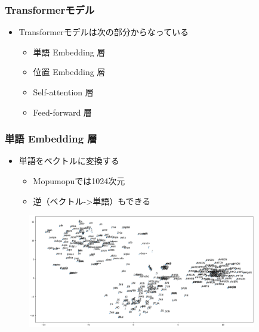 \documentclass[14pt]{beamer}
\begin{document}
\begin{frame}
	\frametitle{Transformerモデル}

	\begin{itemize}
		\item Transformerモデルは次の部分からなっている
			\begin{itemize}
				\item 単語 Embedding 層
				\item 位置 Embedding 層
				\item Self-attention 層
				\item Feed-forward 層
			\end{itemize}
	\end{itemize}

\end{frame}

\begin{frame}
	\frametitle{単語 Embedding 層}

	\begin{itemize}
		\item 単語をベクトルに変換する
			\begin{itemize}
				\item Mopumopuでは1024次元
				\item 逆（ベクトル->単語）もできる
			\end{itemize}
	\end{itemize}

	\begin{figure}[H]
		\centering
		\includegraphics[width=10cm]{embed.png}
	\end{figure}
\end{frame}
\end{document}
